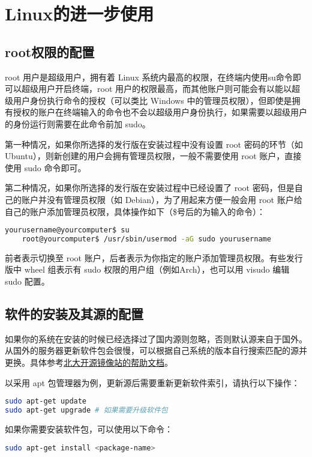 \section{Linux的进一步使用}

\subsection{root权限的配置}

root 用户是超级用户，拥有着 Linux 系统内最高的权限，在终端内使用su命令即可以超级用户开启终端，root 用户的权限最高，而其他账户则可能会有以能以超级用户身份执行命令的授权（可以类比 Windows 中的管理员权限），但即使是拥有授权的账户在终端输入的命令也不会以超级用户身份执行，如果需要以超级用户的身份运行则需要在此命令前加 sudo。

第一种情况，如果你所选择的发行版在安装过程中没有设置 root 密码的环节（如 Ubuntu），则新创建的用户会拥有管理员权限，一般不需要使用 root 账户，直接使用 sudo 命令即可。

第二种情况，如果你所选择的发行版在安装过程中已经设置了 root 密码，但是自己的账户并没有管理员权限（如 Debian），为了用起来方便一般会用 root 账户给自己的账户添加管理员权限，具体操作如下（\$号后的为输入的命令）：

\begin{lstlisting}[language=bash]
    yourusername@yourcomputer$ su
    root@yourcomputer$ /usr/sbin/usermod -aG sudo yourusername
\end{lstlisting}

前者表示切换至 root 账户，后者表示为你指定的账户添加管理员权限。有些发行版中 wheel 组表示有 sudo 权限的用户组（例如Arch），也可以用 visudo 编辑 sudo 配置。

\subsection{软件的安装及其源的配置}

如果你的系统在安装的时候已经选择过了国内源则忽略，否则默认源来自于国外。从国外的服务器更新软件包会很慢，可以根据自己系统的版本自行搜索匹配的源并更换。具体参考\href{https://mirrors.pku.edu.cn/Help}{北大开源镜像站的帮助文档}。

以采用 apt 包管理器为例，更新源后需要重新更新软件索引，请执行以下操作：

\begin{lstlisting}[language=bash]
sudo apt-get update
sudo apt-get upgrade # 如果需要升级软件包
\end{lstlisting}

如果你需要安装软件包，可以使用以下命令：
\begin{lstlisting}[language=bash]
sudo apt-get install <package-name>
\end{lstlisting}

